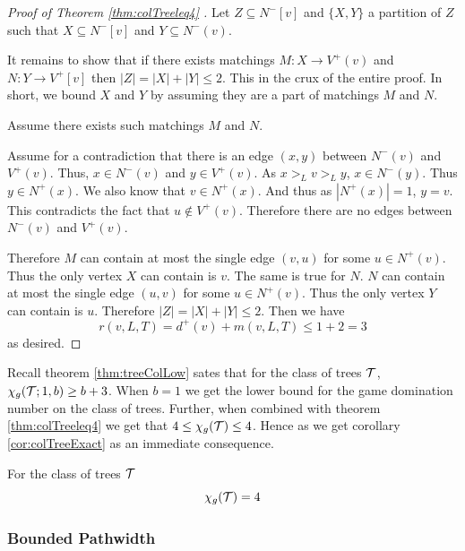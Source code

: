 \begin{proof}[Proof of Theorem \ref{thm:colTreeleq4} \cite{KIERSTEAD2000}]
    Let $Z\subseteq N^-[v]$ and $\{X,Y\}$ a partition of $Z$ such that $X\subseteq N^-[v]$ and $Y\subseteq N^-(v)$. 
    
    It remains to show that if there exists matchings $M:X\to V^+(v)$ and $N:Y\to V^+[v]$ then $|Z| = |X|+|Y| \leq 2$. This in the crux of the entire proof. In short, we bound $X$ and $Y$ by assuming they are a part of matchings $M$ and $N$.
    
    Assume there exists such matchings $M$ and $N$. 
    
    Assume for a contradiction that there is an edge $(x,y)$ between $N^-(v)$ and $V^+(v)$. Thus, $x\in N^-(v)$ and $y\in V^+(v)$. As $x >_L v >_L y$, $x \in N^-(y)$. Thus $y\in N^+(x)$. We also know that $v\in N^+(x)$. And thus as $|N^+(x)|=1$, $y=v$. This contradicts the fact that $u\notin V^+(v)$. Therefore there are no edges between $N^-(v)$ and $V^+(v)$.
    
    Therefore $M$ can contain at most the single edge $(v,u)$ for some $u\in N^+(v)$. Thus the only vertex $X$ can contain is $v$.    
    The same is true for $N$. $N$ can contain at most the single edge $(u,v)$ for some $u\in N^+(v)$. Thus the only vertex $Y$ can contain is $u$. Therefore $|Z| = |X|+|Y|\leq 2$.    
    Then we have \[r(v,L,T) = d^+(v)+m(v,L,T) \leq 1 + 2 =3\] as desired.
\end{proof}

Recall theorem \ref{thm:treeColLow} sates that for the class of trees $\mathcal{T}$, $\chi_g(\mathcal{T};1,b) \geq b+3 $. When $b=1$ we get the lower bound for the game domination number on the class of trees. Further, when combined with theorem \ref{thm:colTreeleq4} we get that $4 \leq \chi_g(\mathcal{T}) \leq 4$. Hence as we get corollary \ref{cor:colTreeExact} as an immediate consequence.  

\begin{corollary} \label{cor:colTreeExact}
    For the class of trees $\mathcal{T}$ \[\chi_g(\mathcal{T}) = 4\]
\end{corollary}

\subsubsection{Bounded Pathwidth}

